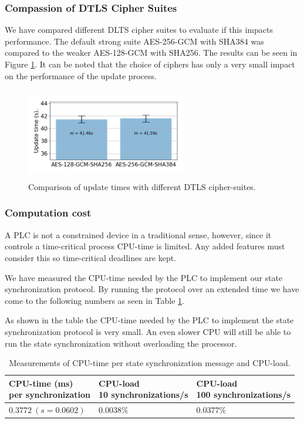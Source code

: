 \subsubsection{Compassion of DTLS Cipher Suites}
We have compared different DLTS cipher suites to evaluate if this impacts performance. The default strong suite AES-256-GCM with SHA384 was compared to the weaker AES-128-GCM with SHA256. The results can be seen in Figure \ref{figure:ciphers}. It can be noted that the choice of ciphers has only a very small impact on the performance of the update process.

\begin{figure}[ht]
\vspace*{-0.2in}
   \centering
    \includegraphics[height=4cm, width=7cm]{papers/digital-twin/images/FIG9_TII-19-1326}
    \vspace*{-0.15in}
    \caption{Comparison of update times with different DTLS cipher-suites.}
    \label{figure:ciphers}
\end{figure}

\subsubsection{Computation cost}
A PLC is not a constrained device in a traditional sense, however, since it controls a time-critical process CPU-time is limited. Any added features must consider this so time-critical deadlines are kept.

We have measured the CPU-time needed by the PLC to implement our state synchronization protocol. By running the protocol over an extended time we have come to the following numbers as seen in Table \ref{table:cpu-time}. 

As shown in the table the CPU-time needed by the PLC to implement the state synchronization protocol is very small. An even slower CPU will still be able to run the state synchronization without overloading the processor.

\begin{table}[ht]
\begin{tabular}{lll}

 \thead{CPU-time (ms)\\per synchronization} & \thead{ CPU-load  \\ 10 synchronizations/s} & \thead{CPU-load \\ 100 synchronizations/s} \\ \hline
           $0.3772 \: (s = 0.0602)$   & $0.0038\%$   &   $0.0377\%$                       \\ 
\end{tabular}
\caption{Measurements of CPU-time per state synchronization message and CPU-load.}
\label{table:cpu-time}
\end{table}



